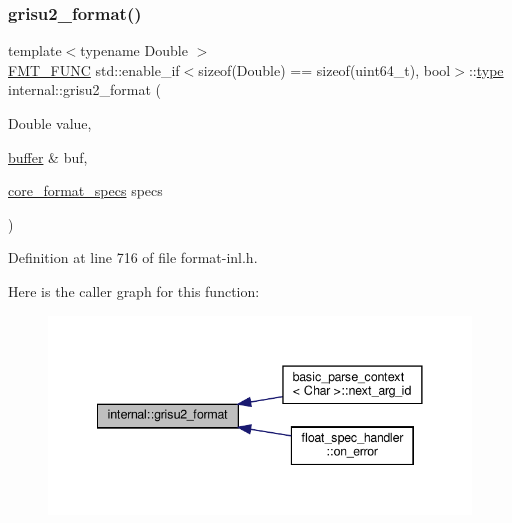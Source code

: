 \subsubsection{\texorpdfstring{grisu2\+\_\+format()}{grisu2\_format()}\hspace{0.1cm}{\footnotesize\ttfamily [1/3]}}
{\footnotesize\ttfamily template$<$typename Double $>$ \\
\hyperlink{format_8h_a02c8898388e0ae59aab58be14fcd4e05}{F\+M\+T\+\_\+\+F\+U\+NC} std\+::enable\+\_\+if$<$sizeof(Double) == sizeof(uint64\+\_\+t), bool$>$\+::\hyperlink{namespaceinternal_a8661864098ac0acff9a6dd7e66f59038}{type} internal\+::grisu2\+\_\+format (\begin{DoxyParamCaption}\item[{Double}]{value,  }\item[{\hyperlink{namespaceinternal_a5fcdbc3efad1f390e6c3f0fdafa56122}{buffer} \&}]{buf,  }\item[{\hyperlink{structcore__format__specs}{core\+\_\+format\+\_\+specs}}]{specs }\end{DoxyParamCaption})}



Definition at line 716 of file format-\/inl.\+h.

Here is the caller graph for this function\+:
\nopagebreak
\begin{figure}[H]
\begin{center}
\leavevmode
\includegraphics[width=341pt]{namespaceinternal_a2cba199f690b1f46cbf62c8e9e2786bc_icgraph}
\end{center}
\end{figure}
\mbox{\label{namespaceinternal_af9ded6caf43e3045bce5bfdd382284ed}} 
